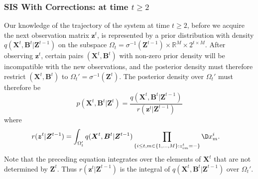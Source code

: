 \documentclass[9pt, xcolor={dvipsnames,svgnames,table}]{beamer}
\newcommand{\Real}{\mathbb R}
\begin{document}
\begin{frame}
    \frametitle{SIS With Corrections: at time $t \geq 2$}
    Our knowledge of the trajectory of the system at time $t \geq 2$, before we acquire the next observation matrix $\bm{z}^t$, is represented by a prior distribution with density $q(\bm{X}^t, \bm{B}^t | \bm{Z}^{t-1})$ on the subspace $\Omega_t = \sigma^{-1}(\bm{Z}^{t-1}) \times \Real^M \times 2^{t \times M}$. After observing $\bm{z}^t$, certain pairs $(\bm{X}^t, \bm{B}^t)$ with non-zero prior density will be incompatible with the new observations, and the posterior density must therefore restrict $(\bm{X}^t, \bm{B}^t)$ to $\Omega_t' = \sigma^{-1}(\bm{Z}^t)$. The posterior density over $\Omega_t'$ must therefore be
    \begin{equation*}
        p(\bm{X}^t, \bm{B}^t |\bm{Z}^t) = \frac{q(\bm{X}^t, \bm{B}^t | \bm{Z}^{t-1})}{r(\bm{z}^t | \bm{Z}^{t-1})} 
    \end{equation*}
    where
    \begin{align*}
        r(\bm{z}^t | \bm{Z}^{t-1})  &= \int_{\Omega_t'} q(\bm{X}^t, \bm{B}^t | \bm{Z}^{t-1}) \prod_{ \{ i \leq t, m \in \{1, \ldots, M \} : z^t_{im} = - \} } \D x^i_m.
    \end{align*}
    Note that the preceding equation integrates over the elements of $\bm{X}^t$ that are not determined by $\bm{Z}^t$. Thus $r(\bm{z}^t | \bm{Z}^{t-1})$ is the integral of $q(\bm{X}^t, \bm{B}^t | \bm{Z}^{t-1})$ over $\Omega_t'$.
\end{frame}
\end{document}
